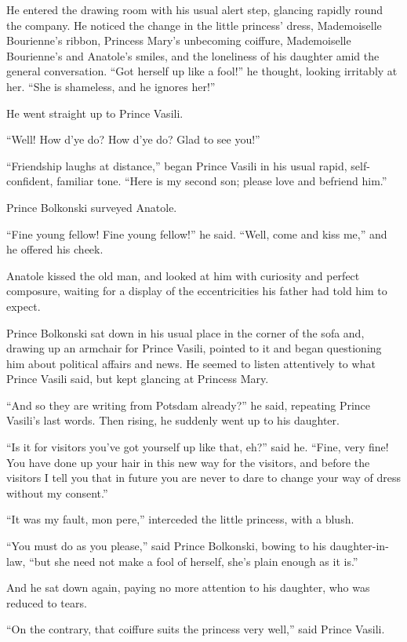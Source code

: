 He entered the drawing room with his usual alert step, glancing
rapidly round the company. He noticed the change in the little
princess' dress, Mademoiselle Bourienne's ribbon, Princess Mary's
unbecoming coiffure, Mademoiselle Bourienne's and Anatole's
smiles, and the loneliness of his daughter amid the general
conversation. ``Got herself up like a fool!'' he thought, looking
irritably at her. ``She is shameless, and he ignores her!''

He went straight up to Prince Vasili.

``Well! How d'ye do? How d'ye do? Glad to see you!''

``Friendship laughs at distance,'' began Prince Vasili in his
usual rapid, self-confident, familiar tone. ``Here is my second
son; please love and befriend him.''

Prince Bolkonski surveyed Anatole.

``Fine young fellow! Fine young fellow!'' he said. ``Well, come
and kiss me,'' and he offered his cheek.

Anatole kissed the old man, and looked at him with curiosity and
perfect composure, waiting for a display of the eccentricities
his father had told him to expect.

Prince Bolkonski sat down in his usual place in the corner of the
sofa and, drawing up an armchair for Prince Vasili, pointed to it
and began questioning him about political affairs and news. He
seemed to listen attentively to what Prince Vasili said, but kept
glancing at Princess Mary.

``And so they are writing from Potsdam already?'' he said,
repeating Prince Vasili's last words. Then rising, he suddenly
went up to his daughter.

``Is it for visitors you've got yourself up like that, eh?'' said
he.  ``Fine, very fine! You have done up your hair in this new
way for the visitors, and before the visitors I tell you that in
future you are never to dare to change your way of dress without
my consent.''

``It was my fault, mon pere,'' interceded the little princess,
with a blush.

``You must do as you please,'' said Prince Bolkonski, bowing to
his daughter-in-law, ``but she need not make a fool of herself,
she's plain enough as it is.''

And he sat down again, paying no more attention to his daughter,
who was reduced to tears.

``On the contrary, that coiffure suits the princess very well,''
said Prince Vasili.

